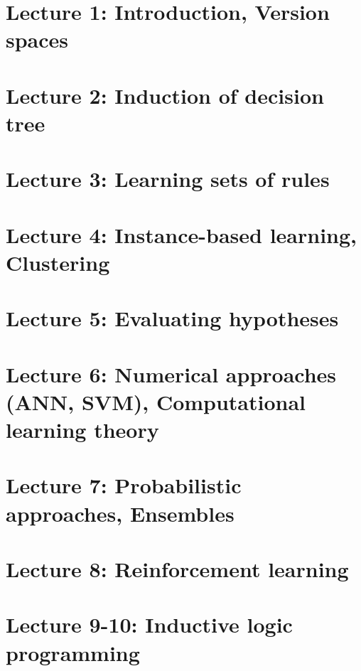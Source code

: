 \documentclass{article}
\begin{document}


\tableofcontents
\clearpage
{}
\setcounter{page}{1}

\section{Lecture 1: Introduction, Version spaces}

\section{Lecture 2: Induction of decision tree}

\section{Lecture 3: Learning sets of rules}

\section{Lecture 4: Instance-based learning, Clustering}

\section{Lecture 5: Evaluating hypotheses}

\section{Lecture 6: Numerical approaches (ANN, SVM), Computational learning theory}

\section{Lecture 7: Probabilistic approaches, Ensembles}

\section{Lecture 8: Reinforcement learning}

\section{Lecture 9-10: Inductive logic programming}

\clearpage
\end{document}

